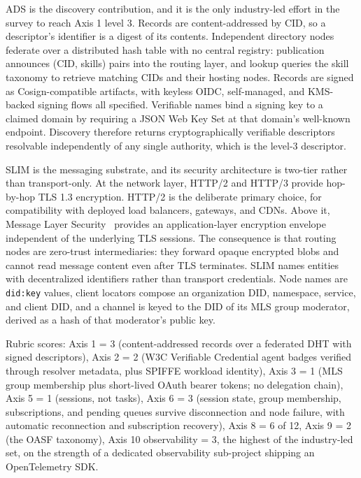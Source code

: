 ADS is the discovery contribution, and it is the only
industry-led effort in the survey to reach Axis 1 level 3.
Records are content-addressed by CID, so a descriptor's
identifier is a digest of its contents. Independent
directory nodes federate over a distributed hash table with
no central registry: publication announces
(CID, skills) pairs into the routing layer, and lookup
queries the skill taxonomy to retrieve matching CIDs and
their hosting nodes. Records are signed as
Cosign-compatible artifacts, with keyless OIDC, self-managed,
and KMS-backed signing flows all specified. Verifiable
names bind a signing key to a claimed domain by requiring a
JSON Web Key Set at that domain's well-known endpoint.
Discovery therefore returns cryptographically verifiable
descriptors resolvable independently of any single
authority, which is the level-3 descriptor.

SLIM is the messaging substrate, and its security
architecture is two-tier rather than transport-only. At the
network layer, HTTP/2 and HTTP/3 provide hop-by-hop TLS 1.3
encryption. HTTP/2 is the deliberate primary choice, for
compatibility with deployed load balancers, gateways, and
CDNs. Above it, Message Layer Security~\cite{rfc9420}
provides an application-layer encryption envelope
independent of the underlying TLS sessions. The consequence
is that routing nodes are zero-trust intermediaries: they
forward opaque encrypted blobs and cannot read message
content even after TLS terminates. SLIM names entities with
decentralized identifiers rather than transport
credentials. Node names are \texttt{did:key} values, client
locators compose an organization DID, namespace, service,
and client DID, and a channel is keyed to the DID of its
MLS group moderator, derived as a hash of that moderator's
public key.

Rubric scores: Axis 1 = 3 (content-addressed records over
a federated DHT with signed descriptors), Axis 2 = 2
(W3C Verifiable Credential agent badges verified through
resolver metadata, plus SPIFFE workload identity),
Axis 3 = 1 (MLS group membership plus short-lived OAuth
bearer tokens; no delegation chain), Axis 5 = 1 (sessions,
not tasks), Axis 6 = 3 (session state, group membership,
subscriptions, and pending queues survive disconnection and
node failure, with automatic reconnection and subscription
recovery), Axis 8 = 6 of 12, Axis 9 = 2 (the OASF
taxonomy), Axis 10 observability = 3, the highest of the
industry-led set, on the strength of a dedicated
observability sub-project shipping an OpenTelemetry SDK.

